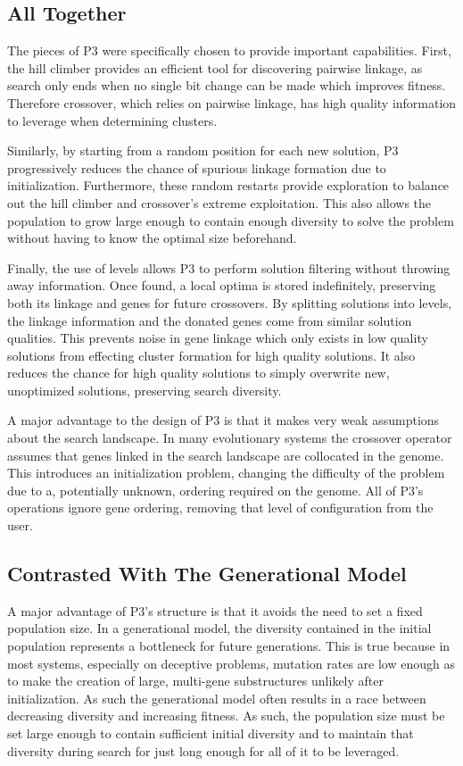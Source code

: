 \documentclass{sig-alternate}
\begin{document}
\subsection{All Together}
\label{sec-alltogether}
The pieces of P3 were specifically chosen to provide important capabilities.  First,
the hill climber provides an efficient tool for discovering pairwise linkage, as
search only ends when no single bit change can be made which improves fitness.
Therefore crossover, which relies on pairwise linkage, has high quality information
to leverage when determining clusters.

Similarly, by starting from a random position for each new solution, P3 progressively reduces
the chance of spurious linkage formation due to initialization.  Furthermore, these random
restarts provide exploration to balance out the hill climber and crossover's extreme
exploitation.  This also allows the population to grow large enough to contain enough
diversity to solve the problem without having to know the optimal size beforehand.

Finally, the use of levels allows P3 to perform solution filtering
without throwing away information.  Once found, a local optima is
stored indefinitely, preserving both its linkage and genes for future
crossovers.  By splitting solutions into levels, the linkage
information and the donated genes come from similar solution
qualities.  This prevents noise in gene linkage which only exists in
low quality solutions from effecting cluster formation for high
quality solutions.  It also reduces the chance for high quality
solutions to simply overwrite new, unoptimized solutions, preserving
search diversity.

  A major advantage to the design of P3 is that it makes very weak
  assumptions about the search landscape.  In many evolutionary
  systems the crossover operator assumes that genes linked in the
  search landscape are collocated in the genome.  This introduces an
  initialization problem, changing the difficulty of the problem due
  to a, potentially unknown, ordering required on the genome.  All of
  P3's operations ignore gene ordering, removing that level of
  configuration from the user.

\subsection{Contrasted With The Generational Model}
A major advantage of P3's structure is that it avoids the need to set
a fixed population size.  In a generational model, the diversity
contained in the initial population represents a bottleneck for future
generations.  This is true because in most systems, especially on
deceptive problems, mutation rates are low enough as to make the
creation of large, multi-gene substructures unlikely after
initialization.  As such the generational model often results in a
race between decreasing diversity and increasing fitness. As such, the
population size must be set large enough to contain sufficient initial
diversity and to maintain that diversity during search for just long
enough for all of it to be leveraged.
\end{document}
